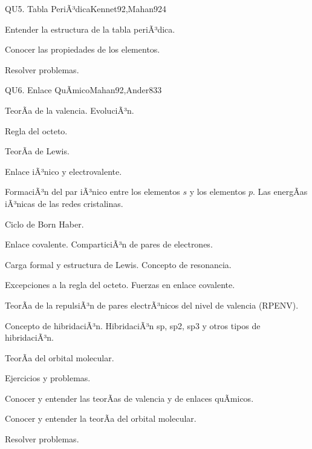 \begin{syllabus}
\begin{unit}{QU5. Tabla PeriÃ³dica}{Kennet92,Mahan92}{4}
   \begin{unitgoals}
      \item Entender la estructura de la tabla periÃ³dica.
      \item Conocer las propiedades de los elementos.
      \item Resolver problemas.
   \end{unitgoals}
\end{unit}

\begin{unit}{QU6. Enlace QuÃ­mico}{Mahan92,Ander83}{3}
   \begin{topics}
	\item TeorÃ­a de  la valencia. EvoluciÃ³n.
	\item Regla del octeto.
	\item TeorÃ­a de Lewis.
	\item Enlace iÃ³nico y electrovalente.
	\item FormaciÃ³n del par iÃ³nico entre los elementos $s$ y los elementos $p$. Las energÃ­as iÃ³nicas de las redes cristalinas.
	\item Ciclo de Born Haber.
	\item Enlace covalente. ComparticiÃ³n de pares de electrones.
	\item Carga formal y estructura de Lewis. Concepto de resonancia.
	\item Excepciones a la regla del octeto. Fuerzas en enlace covalente.
	\item TeorÃ­a de la repulsiÃ³n de pares electrÃ³nicos del nivel de valencia (RPENV).
	\item Concepto de hibridaciÃ³n. HibridaciÃ³n sp, sp2, sp3 y otros tipos de hibridaciÃ³n.
	\item TeorÃ­a del orbital molecular.
	\item Ejercicios y problemas.
   \end{topics}

   \begin{unitgoals}
      \item Conocer y entender las teorÃ­as de valencia y de enlaces quÃ­micos.
      \item Conocer y entender la teorÃ­a del orbital molecular.
      \item Resolver problemas.
   \end{unitgoals}
\end{unit}


\end{syllabus}
